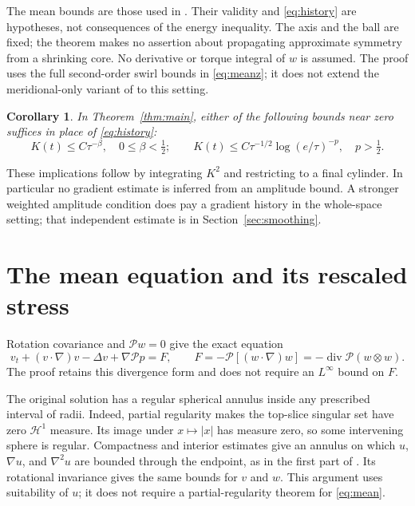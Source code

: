 \documentclass[11pt]{article}
\newtheorem{corollary}[theorem]{Corollary}
\theoremstyle{remark}
\newcommand{\PP}{\mathcal P}
\newcommand{\diver}{\operatorname{div}}
\begin{document}
The mean bounds are those used in \cite{CIV}. Their validity and
\eqref{eq:history} are hypotheses, not consequences of the energy inequality.
The axis and the ball are fixed; the theorem makes no assertion about
propagating approximate symmetry from a shrinking core. No derivative or
torque integral of $w$ is assumed. The proof uses the full second-order
swirl bounds in \eqref{eq:meanz}; it does not extend the meridional-only
variant of \cite[Remark~5.2]{CIV} to this setting.

\begin{corollary}\label{cor:powers}
In Theorem~\ref{thm:main}, either of the following bounds near zero
suffices in place of \eqref{eq:history}:
\[
 K(t)\leq C\tau^{-\beta},\quad 0\leq\beta<\tfrac12;
 \qquad
 K(t)\leq C\tau^{-1/2}\log(e/\tau)^{-p},\quad p>\tfrac12.
\]
\end{corollary}

These implications follow by integrating $K^2$ and restricting to a
final cylinder. In particular no
gradient estimate is inferred from an amplitude bound. A stronger
weighted amplitude condition does pay a gradient history in the
whole-space setting; that independent estimate is in
Section~\ref{sec:smoothing}.

\section{The mean equation and its rescaled stress}

Rotation covariance and $\PP w=0$ give the exact equation
\begin{equation}\label{eq:mean}
 v_t+(v\cdot\nabla)v-\Delta v+\nabla\PP p=F,
 \qquad F=-\PP[(w\cdot\nabla)w]=-\diver\PP(w\otimes w).
\end{equation}
The proof retains this divergence form and does not require an
$L^\infty$ bound on $F$.

The original solution has a regular spherical annulus inside any
prescribed interval of radii. Indeed, partial regularity makes the
top-slice singular set have zero $\mathcal H^1$ measure. Its image under
$x\mapsto|x|$ has measure zero, so some intervening sphere is regular.
Compactness and interior estimates give an annulus on which $u$,
$\nabla u$, and $\nabla^2u$ are bounded through the endpoint, as in the
first part of \cite[Lemma~3.2]{CIV}. Its rotational invariance gives the
same bounds for $v$ and $w$. This argument uses suitability of $u$;
it does not require a partial-regularity theorem for \eqref{eq:mean}.
\end{document}
